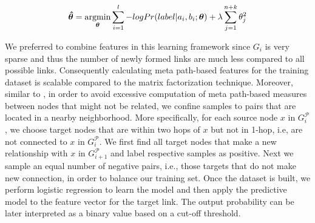 
\begin{equation}
\boldsymbol{\hat{\theta}} = 
\operatorname*{argmin}\limits_{\boldsymbol{\theta}}\sum_{i=1}^l -log Pr(label |a_i, b_i; \boldsymbol{\theta}) + \lambda \sum_{j=1}^{n+k} \theta_j^2
\end{equation}
 
We preferred to combine features in this learning framework since $G_i$ is very sparse and thus the number of newly formed links are much less compared to all possible links. Consequently calculating meta path-based features for the training dataset is scalable compared to the matrix factorization technique. Moreover, similar to \cite{sun2011ASONAM}, in order to avoid excessive computation of meta path-based measures between nodes that might not be related, we confine samples to pairs that are located in a nearby neighborhood. More specifically, for each source node $x$ in $G^\mathcal{P}_{i}$, we choose target nodes that are within two hops of $x$ but not in 1-hop, i.e, are not connected to $x$ in $G^\mathcal{P}_{i}$. We first find all target nodes that make a new relationship with $x$  in $G^\mathcal{P}_{i+1}$ and label respective samples as positive. Next we sample an equal number of negative pairs, i.e., those targets that do not make new connection, in order to balance our training set. Once the dataset is built, we perform logistic regression to learn the model and then apply the predictive model to the feature vector for the target link. The output probability can be later interpreted as a binary value based on a cut-off threshold.










